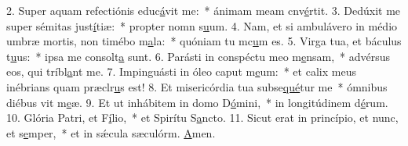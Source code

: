 2. Super aquam refectiónis educ\uline{á}vit me:~* ánimam meam cnv\uline{é}rtit.
3. Dedúxit me super sémitas just\uline{í}tiæ:~* propter nomn s\uline{u}um.
4. Nam, et si ambulávero in médio umbræ mortis, non timébo m\uline{a}la:~* quóniam tu mc\uline{u}m es.
5. Virga tua, et báculus t\uline{u}us:~* ipsa me consolt\uline{a} sunt.
6. Parásti in conspéctu meo m\uline{e}nsam,~* advérsus eos, qui tríbl\uline{a}nt me.
7. Impinguásti in óleo caput m\uline{e}um:~* et calix meus inébrians quam præclr\uline{u}s est!
8. Et misericórdia tua subse\uline{qué}tur me~* ómnibus diébus vit m\uline{e}æ.
9. Et ut inhábitem in domo D\uline{ó}mini,~* in longitúdinem d\uline{é}rum.
10. Glória Patri, et F\uline{í}lio,~* et Spirítu S\uline{a}ncto.
11. Sicut erat in princípio, et nunc, et s\uline{e}mper,~* et in sǽcula sæculórm. \uline{A}men.
